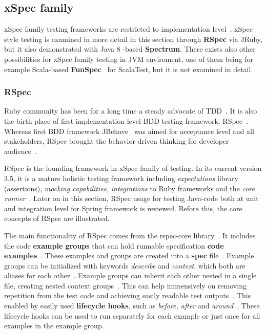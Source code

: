     \subsection{xSpec family}
    xSpec family testing frameworks are restricted to implementation level~\cite{solis2011study}. xSpec style testing
    is examined in more detail in this section through \textbf{RSpec} via JRuby, but it also demonstrated with
    Java 8 -based \textbf{Spectrum}. There exists also other possibilities for xSpec family testing in JVM enviroment,
    one of them being for example Scala-based \textbf{FunSpec}~\cite{funspec} for ScalaTest, but it is not examined in detail.

    \subsubsection{RSpec}
    Ruby community has been for a long time a steady advocate of TDD~\cite{lerner2009forge}. It is also the birth place
    of first implementation level BDD testing framework: RSpec~\cite{astels2006new}. Whereas first BDD framework
    JBehave~\cite{bdd2006north} was aimed for acceptance level and all stakeholders, RSpec brought the behavior driven thinking for developer
    audience~\cite{astels2006new}.

    RSpec is the founding framework in xSpec family of testing. In its current version 3.5, it is a mature holistic testing
    framework including \textit{expectations} library (assertions), \textit{mocking capabilities, integrations} to Ruby frameworks and the \textit{core runner}~\cite{rspecdoc}.
    Later on in this section, RSpec usage for testing Java-code both at unit and integration level for Spring framework is reviewed.
    Before this, the core concepts of RSpec are illustrated.

    The main functionality of RSpec comes from the rspec-core library~\cite{rspecdoc}. It includes the code \textbf{example groups} that can hold runnable
    specification \textbf{code examples}~\cite{chelimsky2010rspec}. These examples and groups are created into a \textbf{spec} file~\cite{chelimsky2010rspec}.
    Example groups can be initialized with keywords \textit{describe}
    and \textit{context}, which both are aliases for each other~\cite{rspec-core}. Example groups can inherit each other nested in a single
    file, creating nested context groups~\cite{rspec-core}. This can help immensively on removing repetition from the test code
    and achieving easily readable test outputs~\cite{chelimsky2010rspec}. This enabled by easily used \textbf{lifecycle hooks},
    such as \textit{before, after} and \textit{around}~\cite{chelimsky2010rspec}.
    These lifecycle hooks can be used to run separately for each example or just once for all examples in the example group.

